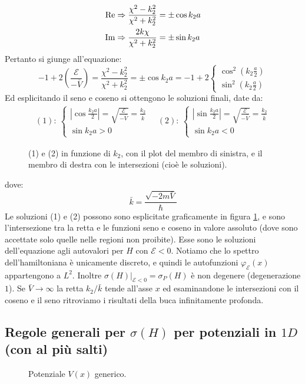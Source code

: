 \documentclass[../../FisicaTeorica.tex]{subfiles}
\begin{document}
\begin{align*}
\operatorname{Re}&\Rightarrow \frac{\chi^2-k_2^2}{\chi^2+k_2^2} = \pm \cos k_2 a\\
\operatorname{Im} &\Rightarrow \frac{2k \chi}{\chi^2 + k_2^2}=\pm \sin k_2 a
\end{align*}
Pertanto si giunge all'equazione:
\[
-1+2\left(\frac{\mathcal{E}}{-\bar{V}}\right)=\frac{\chi^2-k_2^2}{\chi^2+k_2^2}=\pm \cos k_2 a = -1+2\begin{cases}
\cos^2\left(k_2\frac{a}{2}\right)\\
\sin^2\left(k_2 \frac{a}{2}\right)
\end{cases}
\]
Ed esplicitando il seno e coseno si ottengono le soluzioni finali, date da:
\begin{align*}
(1):\>
\begin{cases}
|\cos \frac{k_2 a}{2}| = \sqrt{\frac{\mathcal{E}}{-\bar{V}}} = \frac{k_2}{\bar{k}}\\
\sin k_2 a >0
\end{cases} \quad (2):\
\begin{cases}
|\sin \frac{k_2 a}{2}|= \sqrt{\frac{\mathcal{E}}{-\bar{V}}} = \frac{k_2}{\bar{k}}\\
\sin k_2 a < 0
\end{cases}
\end{align*}
\begin{figure}
\centering

\caption{(1) e (2) in funzione di $k_2$, con il plot del membro di sinistra, e il membro di destra con le intersezioni (cioè le soluzioni).}
\label{fig:solution1and2}
\end{figure}
dove:
\[
\bar{k}=\frac{\sqrt{-2m\bar{V}}}{\hbar}
\]
Le soluzioni (1) e (2) possono sono esplicitate graficamente in figura \ref{fig:solution1and2}, e sono l'intersezione tra la retta e le funzioni seno e coseno in valore assoluto (dove sono accettate solo quelle nelle regioni non proibite). Esse sono le soluzioni dell'equazione agli autovalori per $H$ con $\mathcal{E}<0$. Notiamo che lo spettro dell'hamiltoniana è unicamente discreto, e quindi le autofunzioni $\varphi_\mathcal{E}(x)$ appartengono a $L^2$. Inoltre $\sigma(H)|_{\mathcal{E}<0}=\sigma_P(H)$ è non degenere (degenerazione $1$). Se $\bar{V}\to\infty$ la retta $k_2/\bar{k}$ tende all'asse $x$ ed esaminandone le intersezioni con il coseno e il seno ritroviamo i risultati della buca infinitamente profonda.\\

\subsection{Regole generali per $\sigma(H)$ per potenziali in $1D$ (con al più salti)}
\begin{figure}[H]
\centering

\caption{Potenziale $V(x)$ generico.}
\end{figure}
\end{document}
